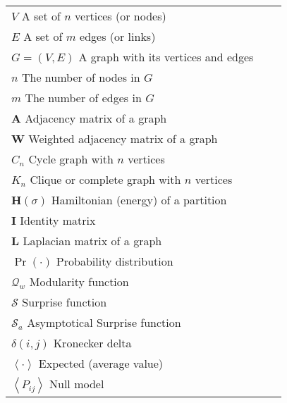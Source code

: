 \begin{longtable}{@{}*{3}{p{\textwidth}@{}}}
$V$ \quad {\color{gray!50}\hrulefill} \quad  A set of $n$ vertices (or nodes) \\
$E$ \quad {\color{gray!50}\hrulefill} \quad  A set of $m$ edges (or links) \\
$G=(V,E)$ \quad {\color{gray!50}\hrulefill} \quad  A graph with its vertices and edges \\
$n$ \quad {\color{gray!50}\hrulefill} \quad  The number of nodes in $G$ \\
$m$ \quad {\color{gray!50}\hrulefill} \quad  The number of edges in $G$ \\
$\mathbf{A}$ \quad {\color{gray!50}\hrulefill} \quad  Adjacency matrix of a graph \\
$\mathbf{W}$ \quad {\color{gray!50}\hrulefill} \quad  Weighted adjacency matrix of a graph \\
$C_n$ \quad {\color{gray!50}\hrulefill} \quad  Cycle graph with $n$ vertices \\
$K_n$ \quad {\color{gray!50}\hrulefill} \quad  Clique or complete graph with $n$ vertices \\
$\mathbf{H}(\sigma)$ \quad {\color{gray!50}\hrulefill} \quad  Hamiltonian (energy) of a partition \\
$\mathbf{I}$ \quad {\color{gray!50}\hrulefill} \quad  Identity matrix \\
$\mathbf{L}$ \quad {\color{gray!50}\hrulefill} \quad  Laplacian matrix of a graph \\
$\Pr(\cdot)$ \quad {\color{gray!50}\hrulefill} \quad  Probability distribution \\
$\mathcal{Q}_w$ \quad {\color{gray!50}\hrulefill} \quad  Modularity function \\
$\mathcal{S}$ \quad {\color{gray!50}\hrulefill} \quad  Surprise function \\
$\mathcal{S}_a$ \quad {\color{gray!50}\hrulefill} \quad  Asymptotical Surprise function \\
$\delta(i,j)$ \quad {\color{gray!50}\hrulefill} \quad  Kronecker delta \\
$\left<\cdot \right>$ \quad {\color{gray!50}\hrulefill} \quad  Expected (average value) \\
$\left<P_{ij}\right>$ \quad {\color{gray!50}\hrulefill} \quad  Null model \\

\end{longtable}
